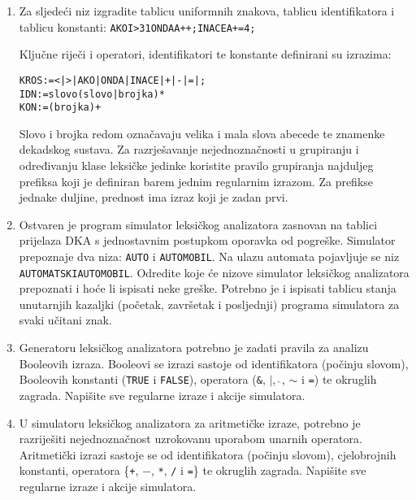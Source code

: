 \documentclass[times, 12pt, utf8]{book}
\begin{document}
\begin{enumerate}[resume]
\item
Za sljedeći niz izgradite tablicu uniformnih znakova, tablicu identifikatora i tablicu konstanti: \texttt{AKOI>31ONDAA++;INACEA+=4;}

Ključne riječi i operatori, identifikatori te konstante definirani su izrazima: 
\begin{alltt}
KROS := < | > | AKO | ONDA | INACE | + | - | = | ;
IDN := slovo ( slovo | brojka )*
KON := (brojka)+
\end{alltt}

Slovo i brojka redom označavaju velika i mala slova abecede te znamenke dekadskog sustava.
Za razrješavanje nejednoznačnosti u grupiranju i određivanju klase leksičke jedinke koristite pravilo grupiranja najduljeg prefiksa koji je definiran barem jednim regularnim izrazom.
Za prefikse jednake duljine, prednost ima izraz koji je zadan prvi. \cite[str.~51]{udzbenik} \cite{auditorne}

\item
Ostvaren je program simulator leksičkog analizatora zasnovan na tablici prijelaza DKA s jednostavnim postupkom oporavka od pogreške.
Simulator prepoznaje dva niza: \texttt{AUTO} i \texttt{AUTOMOBIL}.
Na ulazu automata pojavljuje se niz \texttt{AUTOMATSKIAUTOMOBIL}.
Odredite koje će nizove simulator leksičkog analizatora prepoznati i hoće li ispisati neke greške.
Potrebno je i ispisati tablicu stanja unutarnjih kazaljki (početak, završetak i posljednji) programa simulatora za svaki učitani znak. \cite[str.~58-60]{udzbenik}

\item
Generatoru leksičkog analizatora potrebno je zadati pravila za analizu Booleovih izraza.
Booleovi se izrazi sastoje od identifikatora (počinju slovom), Booleovih konstanti (\texttt{TRUE} i \texttt{FALSE}), operatora (\texttt{\&}, \texttt{\(\vert\)}, \texttt{\(\hat{\ }\)}, \texttt{\(\sim\)} i \texttt{=}) te okruglih zagrada.
Napišite sve regularne izraze i akcije simulatora. \cite[str.~47-48]{udzbenik} \cite{auditorne}

\item
U simulatoru leksičkog analizatora za aritmetičke izraze, potrebno je razriješiti nejednoznačnost uzrokovanu uporabom unarnih operatora.
Aritmetički izrazi sastoje se od identifikatora (počinju slovom), cjelobrojnih konstanti, operatora \{\texttt{+}, \texttt{\(-\)}, \texttt{*}, \texttt{/} i \texttt{=}\} te okruglih zagrada.
Napišite sve regularne izraze i akcije simulatora. \cite[str.~47-48]{udzbenik} \cite{auditorne}


\end{enumerate}
\end{document}
